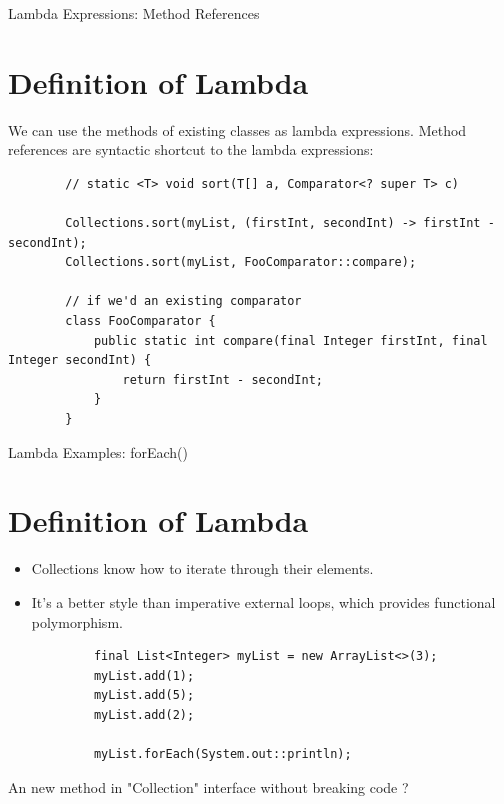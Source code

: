 \documentclass{beamer}
\begin{document}
	\begin{frame}[fragile]{Lambda Expressions: Method References}
		\section{Definition of Lambda}
		We can use the methods of existing classes as lambda expressions.
		Method references are syntactic shortcut to the lambda expressions:
		\begin{lstlisting}
		// static <T> void sort(T[] a, Comparator<? super T> c)
		
		Collections.sort(myList, (firstInt, secondInt) -> firstInt - secondInt);
		Collections.sort(myList, FooComparator::compare);
		
		// if we'd an existing comparator
		class FooComparator {
  			public static int compare(final Integer firstInt, final Integer secondInt) {
    		    return firstInt - secondInt;
  			}
		}
		\end{lstlisting}
		
	\end{frame}	
	
	\begin{frame}[fragile]{Lambda Examples: forEach() }
		\section{Definition of Lambda}
			\begin{itemize}
				\item Collections know how to iterate through their elements.
				\item It's a better style than imperative external loops, which provides functional polymorphism.
			\end{itemize}

			\begin{lstlisting}
    		final List<Integer> myList = new ArrayList<>(3);
    		myList.add(1);
    		myList.add(5);
    		myList.add(2);

    		myList.forEach(System.out::println);
			\end{lstlisting}
			
			An new method in "Collection" interface without breaking code ?
	\end{frame}	
\end{document}
